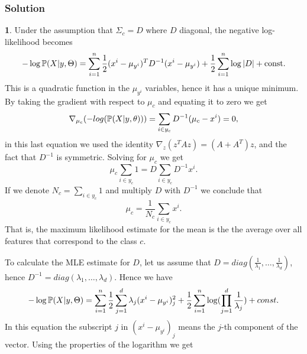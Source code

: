 \documentclass{article}
\begin{document}
\newpage
\subsubsection*{Solution}
\textbf{1}. 
\newline
Under the assumption that $\Sigma_{c}=D$ where $D$ diagonal, the negative log-likelihood becomes
\begin{equation*}
- \log \mathbb{P}(X|y,\Theta)
 = \sum_{i=1}^n \frac{1}{2}(x^i - \mu_{y^i})^TD^{-1}(x^i - \mu_{y^i}) + \frac 1 2\sum_{i=1}^n \log|D| + \text{const.}
\end{equation*}
This is a quadratic function in the $\mu_{y^{i}}$ variables, hence it has a unique minimum. By taking the gradient with respect to $\mu_{c}$ 
and equating it to zero we get
\begin{equation*}
\nabla_{\mu_{c}}(-log(\mathbb{P}(X|y,\theta)))=\sum_{i\in y_{c}}D^{-1}(\mu_{c}-x^{i})=0,
\end{equation*}
in this last equation we used the identity $\nabla_{z} (z^{T}Az)=(A+A^{T})z$, and the fact that $D^{-1}$ is symmetric.
Solving for $\mu_{c}$ we get
\begin{equation*}
\mu_{c}\sum_{i\in y_{c}}1=D\sum_{i\in y_{c}}D^{-1}x^{i}.
\end{equation*}
If we denote $N_{c}=\sum_{i\in y_{c}}1$ and multiply $D$ with $D^{-1}$  we conclude that
\begin{equation*}
\mu_{c}=\frac{1}{N_{c}}\sum_{i\in y_{c}}x^{i}.
\end{equation*}
That is, the maximum likelihood estimate for the mean is the the average over all features that correspond to the class $c$.

To calculate the MLE estimate for $D$, let us assume that $D=diag(\frac{1}{\lambda_{1}},\ldots,\frac{1}{\lambda_{d}})$, hence
$D^{-1}=diag(\lambda_{1},\ldots,\lambda_{d})$. Hence we have
\begin{equation*}
- \log \mathbb{P}(X|y,\Theta)=\sum_{i=1}^{n} \frac{1}{2}\sum_{j=1}^{d}\lambda_{j}(x^{i}-\mu_{y^{i}})^{2}_{j}+\frac{1}{2}\sum_{i=1}^{n}\log(\prod_{j=1}^{d}\frac{1}{\lambda_{j}})+const.
\end{equation*}
In this equation the subscript $j$ in $(x^{i}-\mu_{y^{i}})_{j}$ means the $j$-th component of the vector. Using the properties of the logarithm we get
\end{document}
